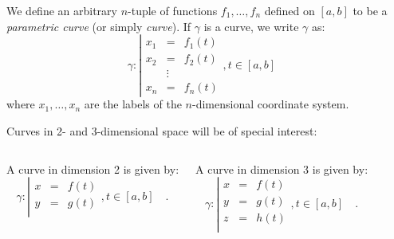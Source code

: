 \begin{frame}
\begin{definition}
We define an arbitrary $n$-tuple of functions $f_1,\dots, f_n$ defined on $[a,b]$ to be a \emph{parametric curve} (or simply \emph{curve}). If $\gamma$ is a curve, we write $\gamma$ as:
\[
\gamma:\left| 
\begin{array}{rcl}
x_1&=&f_1(t)\\
x_2&=&f_2(t)\\
&\vdots & \\
x_n&=&f_n(t)
\end{array} \right., t\in [a,b]\quad 
\]
where $x_1,\dots, x_n$ are the labels of the $n$-dimensional coordinate system.
\end{definition}
Curves in 2- and 3-dimensional space will be of special interest:
\begin{columns}
A curve in dimension 2 is given by:
\[
\gamma:\left| 
\begin{array}{rcl}
x&=&f(t)\\
y&=&g(t)\\
\end{array} \right., t\in [a,b]\quad .
\]

A curve in dimension 3 is given by:
\[
\gamma:\left| 
\begin{array}{rcl}
x&=&f(t)\\
y&=&g(t)\\
z&=&h(t)\\
\end{array} \right., t\in [a,b]\quad .
\]

\end{columns}

\end{frame}
